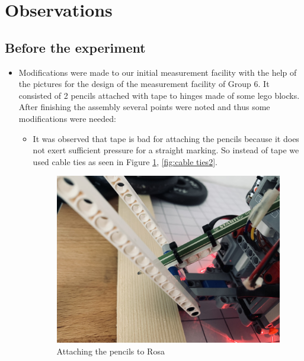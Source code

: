     \section{Observations}
        \subsection{Before the experiment}
        \begin{itemize}
            \item Modifications were made to our initial measurement facility with the help of the pictures for the design of the measurement facility of Group 6.  It consisted of 2 pencils attached with tape to hinges made of some lego blocks. After finishing the assembly several points were noted and thus some modifications were needed: 
            \begin{itemize}
                \item [1.] It was observed that tape is bad for attaching the pencils because it does not exert sufficient pressure for a straight marking. So instead of tape we used cable ties as seen in Figure \ref{fig:cable ties}, \ref{fig:cable ties2}.
                
                \begin{figure}[!ht] 
                        \centering \includegraphics[scale=5.0]{"images/experiment_2/experiment-9.png"}
                        \caption{Attaching the pencils to Rosa}
                        \label{fig:cable ties}
                \end{figure}
                

\end{itemize}
\end{itemize}
